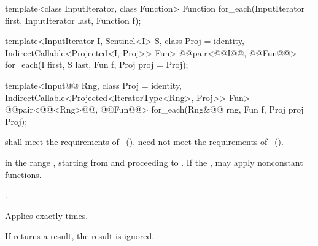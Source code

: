 %
\begin{removedblock}
\begin{itemdecl}
template<class InputIterator, class Function>
  Function for_each(InputIterator first, InputIterator last, Function f);
\end{itemdecl}
\end{removedblock}
\begin{addedblock}
\begin{itemdecl}
template<InputIterator I, Sentinel<I> S, class Proj = identity,
    IndirectCallable<Projected<I, Proj>> Fun>
  @@pair<@@I@\newtxt{)}@, @@Fun@\newtxt{)}@>
    for_each(I first, S last, Fun f, Proj proj = Proj{});

template<Input@@ Rng, class Proj = identity,
    IndirectCallable<Projected<IteratorType<Rng>, Proj>> Fun>
  @@pair<@@<Rng>@\newtxt{)}@, @@Fun@\newtxt{)}@>
    for_each(Rng&@\newtxt{\&}@ rng, Fun f, Proj proj = Proj{});
\end{itemdecl}
\end{addedblock}

\begin{itemdescr}
\begin{removedblock}
\pnum
\requires {} shall meet the requirements of
~().
\enternote {} need not meet the requirements of
~().\exitnote
\end{removedblock}

\pnum
\effects
{} in the range
,
starting from
and proceeding to
.
\enternote If the ,  may apply
nonconstant functions.\exitnote

\pnum
\returns
{}.

\pnum
\complexity
Applies 
exactly
times.

\pnum
\notes
If  returns a result, the result is ignored.
\end{itemdescr}

